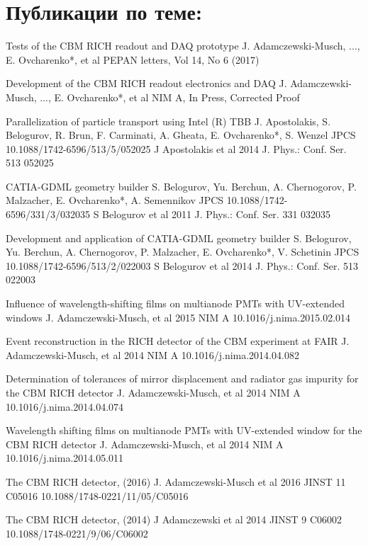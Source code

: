 \section*{Публикации по теме:}

Tests of the CBM RICH readout and DAQ prototype
J. Adamczewski-Musch, ..., E. Ovcharenko*, et al
PEPAN letters, Vol 14, No 6 (2017)

Development of the CBM RICH readout electronics and DAQ
J. Adamczewski-Musch, ..., E. Ovcharenko*, et al
NIM A, In Press, Corrected Proof

Parallelization of particle transport using Intel (R) TBB
J. Apostolakis, S. Belogurov, R. Brun, F. Carminati, A. Gheata, E. Ovcharenko*, S. Wenzel
JPCS
10.1088/1742-6596/513/5/052025
J Apostolakis et al 2014 J. Phys.: Conf. Ser. 513 052025

CATIA-GDML geometry builder
S. Belogurov, Yu. Berchun, A. Chernogorov, P. Malzacher, E. Ovcharenko*, A. Semennikov
JPCS
10.1088/1742-6596/331/3/032035
S Belogurov et al 2011 J. Phys.: Conf. Ser. 331 032035

Development and application of CATIA-GDML geometry builder
S. Belogurov, Yu. Berchun, A. Chernogorov, P. Malzacher, E. Ovcharenko*, V. Schetinin
JPCS
10.1088/1742-6596/513/2/022003
S Belogurov et al 2014 J. Phys.: Conf. Ser. 513 022003


Influence of wavelength-shifting films on multianode PMTs with UV-extended windows
J. Adamczewski-Musch, et al 2015 NIM A
10.1016/j.nima.2015.02.014

Event reconstruction in the RICH detector of the CBM experiment at FAIR
J. Adamczewski-Musch, et al 2014 NIM A
10.1016/j.nima.2014.04.082

Determination of tolerances of mirror displacement and radiator gas impurity for the CBM RICH detector
J. Adamczewski-Musch, et al 2014 NIM A
10.1016/j.nima.2014.04.074

Wavelength shifting films on multianode PMTs with UV-extended window for the CBM RICH detector
J. Adamczewski-Musch, et al 2014 NIM A
10.1016/j.nima.2014.05.011

The CBM RICH detector, (2016)
J. Adamczewski-Musch et al 2016 JINST 11 C05016
10.1088/1748-0221/11/05/C05016

The CBM RICH detector, (2014)
J Adamczewski et al 2014 JINST 9 C06002
10.1088/1748-0221/9/06/C06002

